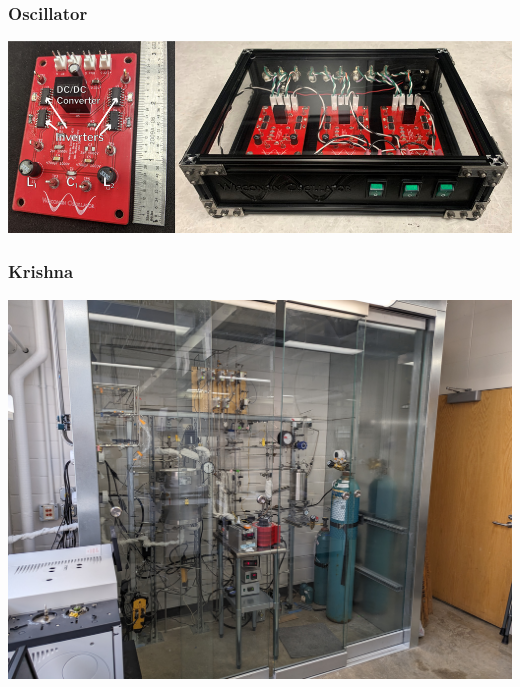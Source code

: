 \documentclass{presentation}
\begin{document}
\begin{frame}\frametitle{Oscillator}
  \includegraphics[width=\textwidth]{"./oscillator-pic.jpeg"}
\end{frame}

\begin{frame}\frametitle{Krishna}
  \includegraphics[width=\textwidth]{"./krishna.jpg"}
\end{frame}
\end{document}
